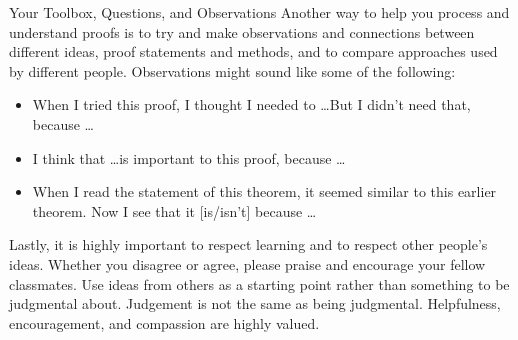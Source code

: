 \begin{section*}{Your Toolbox, Questions, and Observations}
Another way to help you process and understand proofs is to try and make observations and connections between different ideas, proof statements and methods, and to compare approaches used by different people. Observations might sound like some of the following:
\begin{itemize}
\item When I tried this proof, I thought I needed to \ldots But I didn't need that, because \ldots
\item I think that \ldots is important to this proof, because \ldots
\item When I read the statement of this theorem, it seemed similar to this earlier theorem. Now I see that it [is/isn't] because \ldots
\end{itemize}

Lastly, it is highly important to respect learning and to respect other people's ideas.  Whether you disagree or agree, please praise and encourage your fellow classmates.  Use ideas from others as a starting point rather than something to be judgmental about.  Judgement is not the same as being judgmental.  Helpfulness, encouragement, and compassion are highly valued.

\end{section*}

